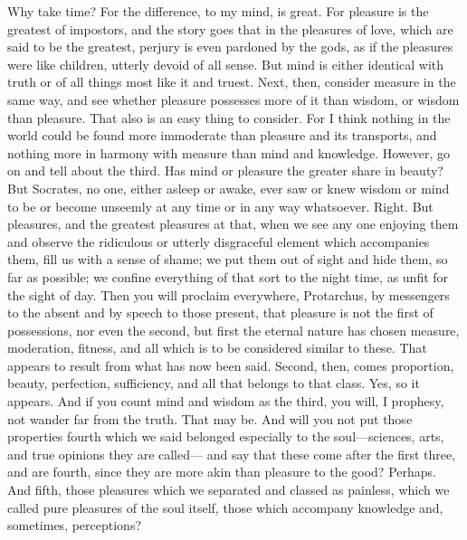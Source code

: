 \documentclass[letterpaper,12pt]{article}
\newcommand{\stephpag}[1]{\marginnote{\small\itshape\fontfamily{ppl}\selectfont #1}}
\begin{document}
\begin{drama}
\protarchusspeaks
Why take time? For the difference, to my mind, is great. For pleasure is the greatest of impostors, and the story goes that in the pleasures of love, which are said to be the greatest, perjury is even pardoned by the gods, as if the pleasures were like children, utterly devoid of all sense. \stephpag{d} But mind is either identical with truth or of all things most like it and truest.
\socratesspeaks
Next, then, consider measure in the same way, and see whether pleasure possesses more of it than wisdom, or wisdom than pleasure.
\protarchusspeaks
That also is an easy thing to consider. For I think nothing in the world could be found more immoderate than pleasure and its transports, and nothing more in harmony with measure than mind and knowledge. \stephpag{e}
\socratesspeaks
However, go on and tell about the third. Has mind or pleasure the greater share in beauty?
\protarchusspeaks
But Socrates, no one, either asleep or awake, ever saw or knew wisdom or mind to be or become unseemly at any time or in any way whatsoever.
\socratesspeaks
Right.
\protarchusspeaks
But pleasures, and the greatest pleasures at that, when we see any one enjoying them and observe the ridiculous or utterly disgraceful element which accompanies them, \stephpag{66 a} fill us with a sense of shame; we put them out of sight and hide them, so far as possible; we confine everything of that sort to the night time, as unfit for the sight of day.
\socratesspeaks
Then you will proclaim everywhere, Protarchus, by messengers to the absent and by speech to those present, that pleasure is not the first of possessions, nor even the second, but first the eternal nature has chosen measure, moderation, fitness, and all which is to be considered similar to these.
\protarchusspeaks
That appears to result from what has now been said. \stephpag{b}
\socratesspeaks
Second, then, comes proportion, beauty, perfection, sufficiency, and all that belongs to that class.
\protarchusspeaks
Yes, so it appears.
\socratesspeaks
And if you count mind and wisdom as the third, you will, I prophesy, not wander far from the truth.
\protarchusspeaks
That may be.
\socratesspeaks
And will you not put those properties fourth which we said belonged especially to the soul---sciences, arts, and true opinions they are called--- \stephpag{c} and say that these come after the first three, and are fourth, since they are more akin than pleasure to the good?
\protarchusspeaks
Perhaps.
\socratesspeaks
And fifth, those pleasures which we separated and classed as painless, which we called pure pleasures of the soul itself, those which accompany knowledge and, sometimes, perceptions?

\end{drama}
\end{document}

